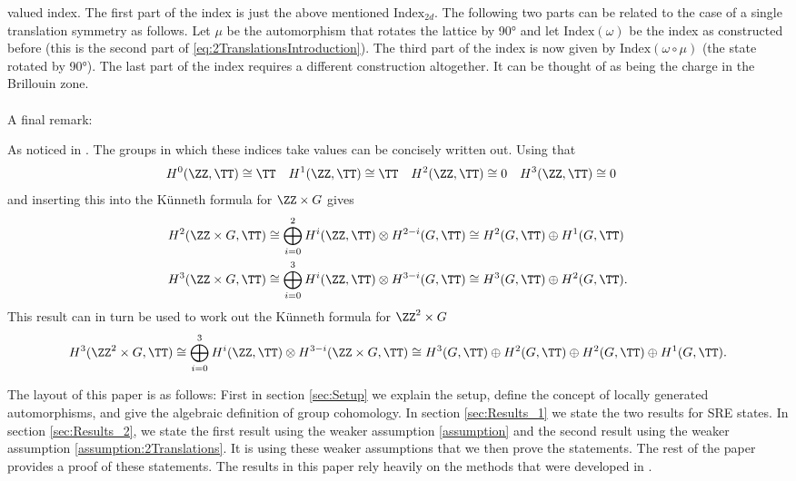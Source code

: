 valued index. The first part of the index is just the above mentioned $\textrm{Index}_{2d}$. The following two parts can be related to the case of a single translation symmetry as follows. Let $\mu$ be the automorphism that rotates the lattice by 90° and let $\textrm{Index}(\omega)$ be the index as constructed before (this is the second part of \ref{eq:2TranslationsIntroduction}). The third part of the index is now given by $\textrm{Index}(\omega\circ\mu)$ (the state rotated by 90°). The last part of the index requires a different construction altogether. It can be thought of as being the charge in the Brillouin zone.
\\\\
A final remark:
\begin{remark}
	As noticed in \cite{Chen_2013}. The groups in which these indices take values can be concisely written out. Using that
	\begin{align}
		H^0(\ZZ,\TT)&\cong \TT& H^1(\ZZ,\TT)&\cong \TT& H^2(\ZZ,\TT)&\cong 0&H^3(\ZZ,\TT)&\cong 0
	\end{align}
	and inserting this into the K\"unneth formula for $\ZZ\times G$ gives
	\begin{align}
		H^2(\ZZ \times G,\TT)&\cong \bigoplus_{i=0}^2 H^i(\ZZ,\TT)\otimes H^{2-i}(G,\TT)\cong H^2(G,\TT)\oplus H^1(G,\TT)\\
		H^3(\ZZ \times G,\TT)&\cong \bigoplus_{i=0}^3 H^i(\ZZ,\TT)\otimes H^{3-i}(G,\TT)\cong H^3(G,\TT)\oplus H^2(G,\TT).
	\end{align}
	This result can in turn be used to work out the K\"unneth formula for $\ZZ^2\times G$
	\begin{equation}
		H^3(\ZZ^2\times G,\TT)\cong \bigoplus_{i=0}^3 H^i(\ZZ,\TT)\otimes H^{3-i}(\ZZ\times G,\TT)\cong H^3(G,\TT)\oplus H^2(G,\TT)\oplus H^2(G,\TT)\oplus H^1(G,\TT).
	\end{equation}
\end{remark}
The layout of this paper is as follows: First in section \ref{sec:Setup} we explain the setup, define the concept of locally generated automorphisms, and give the algebraic definition of group cohomology. In section \ref{sec:Results_1} we state the two results for SRE states. In section \ref{sec:Results_2}, we state the first result using the weaker assumption \ref{assumption} and the second result using the weaker assumption \ref{assumption:2Translations}. It is using these weaker assumptions that we then prove the statements. The rest of the paper provides a proof of these statements. The results in this paper rely heavily on the methods that were developed in \cite{Ogata2d}.
